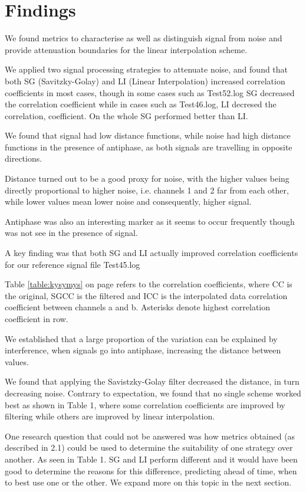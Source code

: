 \section{Findings}

We found metrics to characterise as well as distinguish signal from noise and provide attenuation boundaries for the linear interpolation scheme.

We applied two signal processing strategies to attenuate noise, and found that both SG (Savitzky-Golay) and LI (Linear Interpolation) increased correlation coefficients in most cases, though in some cases such as Test52.log SG decreased the correlation coefficient while in cases such as Test46.log, LI decresed the correlation, coefficient. On the whole SG performed better than LI.

We found that signal had low distance functions, while noise had high distance functions in the presence of antiphase, as both signals are travelling in opposite directions.

Distance turned out to be a good proxy for noise, with the higher values being directly proportional to higher noise, i.e. channels 1 and 2 far from each other, while lower values mean lower noise and consequently, higher signal.

Antiphase was also an interesting marker as it seems to occur frequently though was not see in the presence of signal.

A key finding was that both SG and LI actually improved correlation coefficients for our reference signal file Test45.log

Table \ref{table:kysymys} on page \pageref{table:kysymys} refers to the correlation coefficients, where CC is the original, SGCC is the filtered and ICC is the interpolated data correlation coefficient between channels a and b. Asterisks denote highest correlation coefficient in row.

We established that a large proportion of the variation can be explained by interference, when signals go into antiphase, increasing the distance between values.

We found that applying the Savistzky-Golay filter decreased the distance, in turn decreasing noise. Contrary to expectation, we found that no single scheme worked best as shown in Table 1, where some correlation coefficients are improved by filtering while others are improved by linear interpolation.

One research question that could not be answered was how metrics obtained (as described in 2.1) could be used to determine the suitability of one strategy over another. As seen in Table 1. SG and LI perform different and it would have been good to determine the reasons for this difference, predicting ahead of time, when to best use one or the other. We expand more on this topic in the next section.

